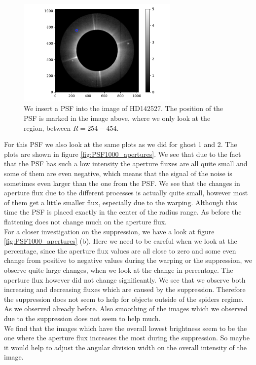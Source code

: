 \begin{figure}[H]
	\centering
		\includegraphics[width=0.7\textwidth]{pics/HDimg_PSF.pdf}
		\caption{We insert a PSF into the image of HD142527. The position of the PSF is marked in the image above, where we only look at the region, between $R=254-454$.}
		\label{fig:HDimg_PSF}
\end{figure}
For this PSF we also look at the same plots as we did for ghost 1 and 2. The plots are shown in figure \ref{fig:PSF1000_apertures}. We see that due to the fact that the PSF has such a low intensity the aperture fluxes are all quite small and some of them are even negative, which means that the signal of the noise is sometimes even larger than the one from the PSF. We see that the changes in aperture flux due to the different processes is actually quite small, however most of them get a little smaller flux, especially due to the warping. Although this time the PSF is placed exactly in the center of the radius range. As before the flattening does not change much on the aperture flux.\\
For a closer investigation on the suppression, we have a look at figure \ref{fig:PSF1000_apertures} (b). Here we need to be careful when we look at the percentage, since the aperture flux values are all close to zero and some even change from positive to negative values during the warping or the suppression, we observe quite large changes, when we look at the change in percentage. The aperture flux however did not change significantly. We see that we observe both increasing and decreasing fluxes which are caused by the suppression. Therefore the suppression does not seem to help for objects outside of the spiders regime. As we observed already before. Also smoothing of the images which we observed due to the suppression does not seem to help much. \\
We find that the images which have the overall lowest brightness seem to be the one where the aperture flux increases the most during the suppression. So maybe it would help to adjust the angular division width on the overall intensity of the image. \\
